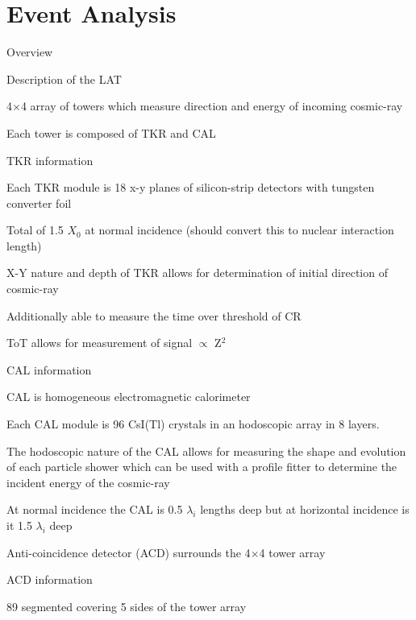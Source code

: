 \documentclass{article}
\begin{document}
\section{Event Analysis}
	\begin{myEnumerate}
		\item Overview
			\begin{myEnumerate}
				\item Description of the LAT
				\item 4$\times$4 array of towers which measure direction and energy of incoming cosmic-ray
				\item Each tower is composed of TKR and CAL
				\item TKR information
				\begin{myEnumerate}
					\item Each TKR module is 18 x-y planes of silicon-strip detectors with tungsten converter foil
					\item Total of 1.5 $X_0$ at normal incidence (should convert this to nuclear interaction length)
					\item X-Y nature and depth of TKR allows for determination of initial direction of cosmic-ray
					\item Additionally able to measure the time over threshold of CR
					\item ToT allows for measurement of signal $\propto$ Z$^2$
				\end{myEnumerate}
				\item CAL information
				\begin{myEnumerate}
					\item CAL is homogeneous electromagnetic calorimeter
					\item Each CAL module is 96 CsI(Tl) crystals in an hodoscopic array in 8 layers.
					\item The hodoscopic nature of the CAL allows for measuring the shape and evolution of each particle shower which can be used with a profile fitter to determine the incident energy of the cosmic-ray
					\item At normal incidence the CAL is 0.5 $\lambda_i$ lengths deep but at horizontal incidence is it 1.5 $\lambda_i$ deep
				\end{myEnumerate}
				\item Anti-coincidence detector (ACD) surrounds the 4$\times$4 tower array
				\item ACD information
				\begin{myEnumerate}
					\item 89 segmented covering 5 sides of the tower array

\end{myEnumerate}
\end{myEnumerate}
\end{myEnumerate}
\end{document}
